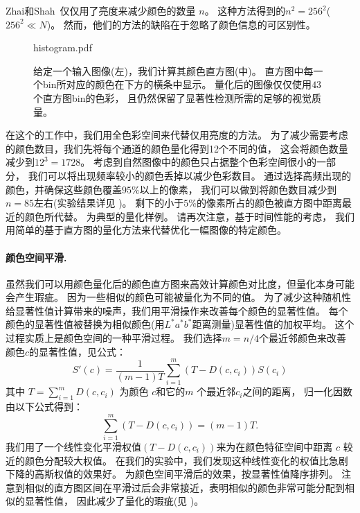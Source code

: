 \documentclass[final]{cvpr}
\newcommand{\Lab}{$L^*a^*b^*$}
\newcommand{\mypara}[1]{\paragraph{#1.}}
\begin{document}
Zhai和Shah~\cite{06acmmm/ZhaiS_spatiotemporal}仅仅用了亮度来减少颜色的数量 $n$。
这种方法得到的$n^2=256^2$($256^2 \ll N$)。
然而，他们的方法的缺陷在于忽略了颜色信息的可区别性。


\begin{figure}
  	\begin{overpic}[width=\columnwidth]{histogram.pdf}
    \end{overpic}
    \caption{给定一个输入图像(左)，我们计算其颜色直方图(中)。
        直方图中每一个bin所对应的颜色在下方的横条中显示。
        量化后的图像仅仅使用$43$个直方图bin的色彩，
        且仍然保留了显著性检测所需的足够的视觉质量。
    }\label{fig:colorFre}
\end{figure}


在这个的工作中，我们用全色彩空间来代替仅用亮度的方法。
为了减少需要考虑的颜色数目，我们先将每个通道的颜色量化得到12个不同的值，
这会将颜色数量减少到$12^3=1728$。
考虑到自然图像中的颜色只占据整个色彩空间很小的一部分，
我们可以将出现频率较小的颜色丢掉以减少色彩数目。
通过选择高频出现的颜色，并确保这些颜色覆盖$95\%$以上的像素，
我们可以做到将颜色数目减少到$n=85$左右(实验结果详见 )。
剩下的小于$5\%$的像素所占的颜色被直方图中距离最近的颜色所代替。
为典型的量化样例。
请再次注意，基于时间性能的考虑，
我们用简单的基于直方图的量化方法来代替优化一幅图像的特定颜色。




\mypara{颜色空间平滑}
虽然我们可以用颜色量化后的颜色直方图来高效计算颜色对比度，但量化本身可能会产生瑕疵。
因为一些相似的颜色可能被量化为不同的值。
为了减少这种随机性给显著性值计算带来的噪声，我们用平滑操作来改善每个颜色的显著性值。
每个颜色的显著性值被替换为相似颜色(用\Lab 距离测量)显著性值的加权平均。
这个过程实质上是颜色空间的一种平滑过程。
我们选择$m=n/4$个最近邻颜色来改善颜色$c$的显著性值，见公式：
\begin{equation}\label{equ:smoothing}
    S'(c) = \frac{1}{(m-1)T} \sum_{i=1}^{m} (T-D(c, c_i))S(c_i)
\end{equation}
其中 $T=\sum_{i=1}^{m} D(c, c_i)$ 为颜色 $c$和它的$m$ 个最近邻$c_i$之间的距离，
归一化因数由以下公式得到：
\begin{equation*}\label{equ:smoothingN}
    \sum_{i=1}^{m} (T-D(c, c_i))=(m-1)T.
\end{equation*}
我们用了一个线性变化平滑权值$(T-D(c, c_i))$来为在颜色特征空间中距离
$c$ 较近的颜色分配较大权值。
在我们的实验中，我们发现这种线性变化的权值比急剧下降的高斯权值的效果好。
为颜色空间平滑后的效果，按显著性值降序排列。
注意到相似的直方图区间在平滑过后会非常接近，表明相似的颜色非常可能分配到相似的显著性值，
因此减少了量化的瑕疵(见 )。
\end{document}
